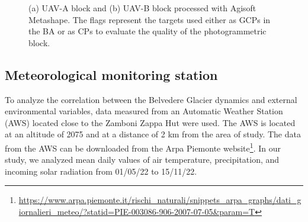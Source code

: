 \begin{figure}
  \centering
  \caption{(a) UAV-A block and (b) UAV-B block processed with Agisoft Metashape. The
    flags represent the targets used either as GCPs in the BA or as CPs to evaluate the
    quality of the photogrammetric block.}
  \label{fig:4:uavblocks}
\end{figure}

\subsection{Meteorological monitoring station}\label{sec:4:meteostation}

To analyze the correlation between the Belvedere Glacier dynamics and external environmental variables, data measured from an Automatic Weather Station (AWS)
located close to the Zamboni Zappa Hut were used. 
The AWS is located at an altitude of \SI{2075}{\masl} and at a distance of 2 km from the area of study.
The data from the AWS can be downloaded from the Arpa Piemonte website\footnote{\url{https://www.arpa.piemonte.it/rischi_naturali/snippets_arpa_graphs/dati_giornalieri_meteo/?statid=PIE-003086-906-2007-07-05&param=T}}.
In our study, we analyzed mean daily values of air temperature, precipitation, and incoming solar radiation from 01/05/22 to 15/11/22.

